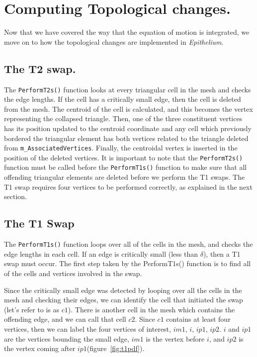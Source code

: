 \section{Computing Topological changes.}
Now that we have covered the way that the equation of motion is integrated, we move on to how the topological changes are implemented in \emph{Epithelium}.  

\subsection{The T2 swap.}
The \texttt{PerformT2s()} function looks at every triangular cell in the mesh and checks the edge lengths. If the cell has a critically small edge, then the cell is deleted from the mesh. The centroid of the cell is calculated, and this becomes the vertex representing the collapsed triangle. Then, one of the three constituent vertices has its position updated to the centroid coordinate and any cell which previously bordered the triangular element has both vertices related to the triangle deleted from \texttt{m\_AssociatedVertices}. Finally, the centroidal vertex is inserted in the position of the deleted vertices. It is important to note that the \texttt{PerformT2s()} function must be called before the \texttt{PerformT1s()} function to make sure that all offending triangular elements are deleted before we perform the T1 swaps. The T1 swap requires four vertices to be performed correctly, as explained in the next section.

\subsection{The T1 Swap}
The \texttt{PerformT1s()} function loops over all of the cells in the mesh, and checks the edge lengths in each cell. If an edge is critically small (less than $\delta$), then a T1 swap must occur. The first step taken by the PerformT1s() function is to find all of the cells and vertices involved in the swap.

Since the critically small edge was detected by looping over all the cells in the mesh and checking their edges, we can identify the cell that initiated the swap (let's refer to is as $c1$). There is another cell in the mesh which contains the offending edge, and we can call that cell $c2$. Since $c1$ contains at least four vertices, then we can label the four vertices of interest, $im1$, $i$, $ip1$, $ip2$. $i$ and $ip1$ are the vertices bounding the small edge, $im1$ is the vertex before $i$, and $ip2$ is the vertex coming after $ip1$(figure~\ref{fig:t1pdf}).

